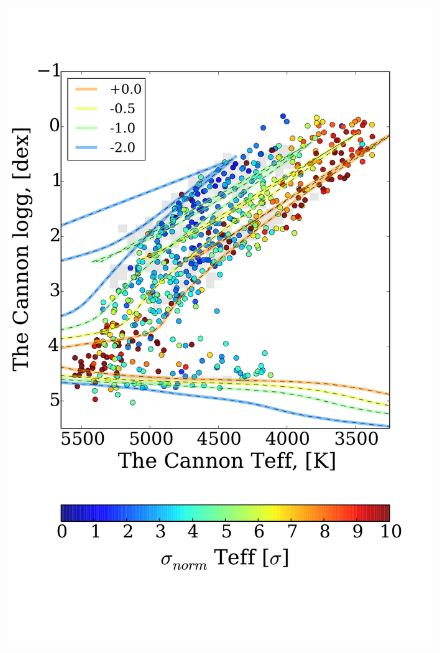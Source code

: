 \documentclass[12pt, preprint]{aastex}
\begin{document}
\begin{figure}[!h]
\centering
  \includegraphics[scale=0.26]{plots/aftersubmit/stdtest_T_normed.pdf}

\end{figure}
\end{document}
